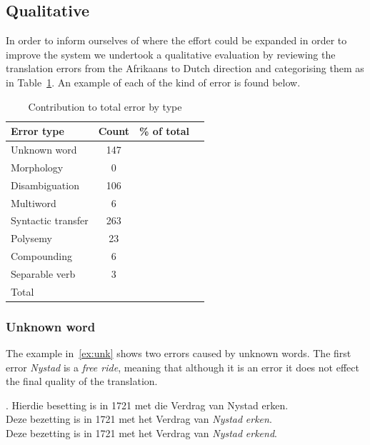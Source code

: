 \documentclass[11pt]{article}
\begin{document}
\subsection{Qualitative}

In order to inform ourselves of where the effort could be expanded in order to improve the 
system we undertook a qualitative evaluation by reviewing the translation errors from the Afrikaans
to Dutch direction and categorising them as in Table~\ref{table:qual}. An example of each 
of the kind of error is found below.

\begin{table}
  \begin{center}
  \begin{tabular}{|l|c|r|r|}
     \hline
     {\bf Error type}    & {\bf Count} & {\bf \% of total} \\
     \hline
     Unknown word        & 147         & \\
     Morphology          & 0           & \\
     Disambiguation      & 106         & \\
     Multiword           & 6           & \\
     Syntactic transfer  & 263         & \\
     Polysemy            & 23          & \\
     Compounding         & 6           & \\
     Separable verb      & 3           & \\
     \hline
     Total               &             & \\
     \hline
  \end{tabular}
    \caption{Contribution to total error by type}
    \label{table:qual}
  \end{center}
\end{table}

\subsubsection{Unknown word}

The example in~\ref{ex:unk} shows two errors caused by unknown words. The first error {\em Nystad} 
is a {\em free ride}, meaning that although it is an error it does not effect the final quality
of the translation. 

\ex. \label{ex:unk} 
    Hierdie besetting is in 1721 met die Verdrag van Nystad erken. \\
    Deze bezetting is in 1721 met het Verdrag van {\em *Nystad} {\em *erken}. \\
    Deze bezetting is in 1721 met het Verdrag van {\em Nystad} {\em erkend}. \\
\end{document}
